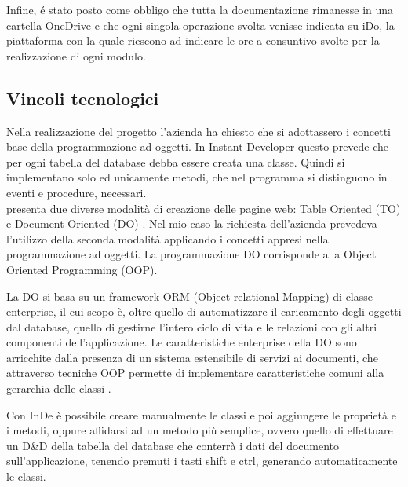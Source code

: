 Infine, é stato posto come obbligo che tutta la documentazione rimanesse in una cartella OneDrive e che ogni singola operazione svolta venisse indicata su iDo, la piattaforma con la quale riescono ad indicare le ore a consuntivo svolte per la realizzazione di ogni modulo.


\subsection{Vincoli tecnologici}\label{vincoliteconlogici}
Nella realizzazione del progetto l'azienda ha chiesto che si adottassero i concetti base della programmazione ad oggetti. In Instant Developer questo prevede che per ogni tabella del database debba essere creata una classe. Quindi si implementano solo ed unicamente metodi, che nel programma si distinguono in eventi e procedure, necessari. \\

\inde presenta due diverse modalità di creazione delle pagine web: Table Oriented (TO)\label{TO} e Document Oriented (DO) \label{DO}. Nel mio caso la richiesta dell'azienda prevedeva l'utilizzo della seconda modalità applicando i concetti appresi nella programmazione ad oggetti. La programmazione DO corrisponde alla Object Oriented Programming (OOP)\label{OOP}.

La DO si basa su un framework ORM (Object-relational Mapping) di classe enterprise, il cui scopo è, oltre quello di automatizzare il caricamento degli oggetti dal database, quello di gestirne l'intero ciclo di vita e le relazioni con gli altri componenti dell'applicazione. Le caratteristiche enterprise della DO sono arricchite dalla presenza di un sistema estensibile di servizi ai documenti, che attraverso tecniche OOP permette di implementare caratteristiche comuni alla gerarchia delle classi \hyperref[bib11]{\cite{[11]}}.

Con InDe è possibile creare manualmente le classi e poi aggiungere le proprietà e i metodi, oppure affidarsi ad un metodo più semplice, ovvero quello di effettuare un D\&D della tabella del database che conterrà i dati del documento sull'applicazione, tenendo premuti i tasti shift e ctrl, generando automaticamente le classi. 

